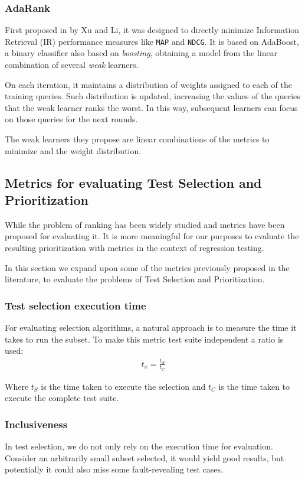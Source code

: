\subsubsection{AdaRank}

First proposed in \cite{xuliadarank} by Xu and Li, it was designed to directly minimize Information Retrieval (IR) performance measures
like \texttt{MAP} and \texttt{NDCG}. It is based on AdaBoost, a binary classifier also based on \emph{boosting},
obtaining a model from the linear combination of several \emph{weak} learners.

On each iteration, it maintains a distribution of weights assigned to each of the training queries.
Such distribution is updated, increasing the values of the queries that the weak learner ranks the worst.
In this way, subsequent learners can focus on those queries for the next rounds.

The weak learners they propose are linear combinations of the metrics to minimize and the weight distribution.

\subsection{Metrics for evaluating Test Selection and Prioritization}
\label{sec:bg-metrics-tsp}

While the problem of ranking has been widely studied and metrics have been proposed for evaluating it. It is more
meaningful for our purposes to evaluate the resulting prioritization with metrics in the context of regression testing.

In this section we expand upon some of the metrics previously proposed in the literature, to evaluate the problems of Test Selection
and Prioritization.

\subsubsection{Test selection execution time}
For evaluating selection algorithms, a natural approach is to measure the time it takes to run the subset. To make 
this metric test suite independent a ratio is used:
\begin{align*}
    t_x = \frac{t_S}{t_C}
\end{align*}

Where $t_S$ is the time taken to execute the selection and $t_C$ is the time taken to execute the complete test suite.

\subsubsection{Inclusiveness}
In test selection, we do not only rely on the execution time for evaluation. Consider an arbitrarily small subset selected, it would yield good results,
but potentially it could also miss some fault-revealing test cases.

